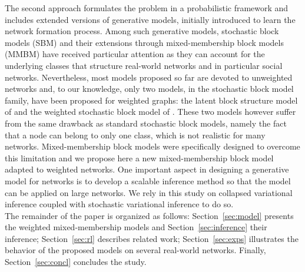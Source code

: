 The second approach formulates the problem in a probabilistic framework and includes extended versions of generative models, initially introduced to learn the network formation process. 
Among such generative models, stochastic block models (SBM) and their extensions through mixed-membership block models (MMBM)  have received particular attention \cite{ Karrer2011,airoldi2009mixed,iMMSB,fan2015dynamic} as they can account for the underlying classes that structure real-world networks and in particular social networks. Nevertheless, most models proposed so far are devoted to unweighted networks and, to our knowledge, only two models, in the stochastic block model family, have been proposed for weighted graphs: the latent block structure model of \cite{aicher2014learning} and the weighted stochastic block model of \cite{peixoto2018nonparametric}. These two models however suffer from the same drawback as standard stochastic block models, namely the fact that a node can belong to only one class, which is not realistic for many networks. Mixed-membership block models were specifically designed to overcome this limitation and we propose here a new mixed-membership block model adapted to weighted networks. One important aspect in designing a generative model for networks is to develop a scalable inference method so that the model can be applied on large networks. We rely in this study on collapsed variational inference coupled with stochastic variational inference to do so.\\
The remainder of the paper is organized as follows: Section~\ref{sec:model} presents the weighted mixed-membership models and Section~\ref{sec:inference} their inference; Section~\ref{sec:rl} describes related work; Section~\ref{sec:exps} illustrates the behavior of the proposed models on several real-world networks. Finally, Section~\ref{sec:concl} concludes the study.


